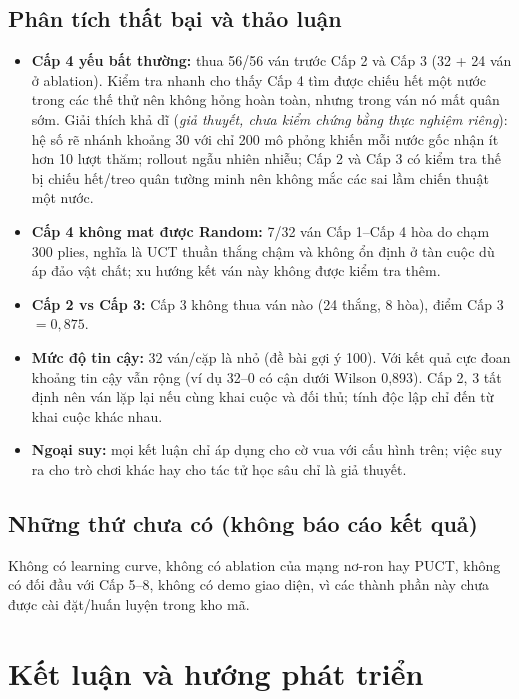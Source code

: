 \documentclass[13pt,a4paper]{extreport}
\begin{document}
\section{Phân tích thất bại và thảo luận}
\begin{itemize}
\item \textbf{Cấp 4 yếu bất thường:} thua 56/56 ván trước Cấp 2 và Cấp 3 (32 + 24 ván ở ablation). Kiểm tra nhanh cho thấy Cấp 4 tìm được chiếu hết một nước trong các thế thử nên không hỏng hoàn toàn, nhưng trong ván nó mất quân sớm. Giải thích khả dĩ (\emph{giả thuyết, chưa kiểm chứng bằng thực nghiệm riêng}): hệ số rẽ nhánh khoảng 30 với chỉ 200 mô phỏng khiến mỗi nước gốc nhận ít hơn 10 lượt thăm; rollout ngẫu nhiên nhiễu; Cấp 2 và Cấp 3 có kiểm tra thế bị chiếu hết/treo quân tường minh nên không mắc các sai lầm chiến thuật một nước.
\item \textbf{Cấp 4 không mat được Random:} 7/32 ván Cấp 1--Cấp 4 hòa do chạm 300 plies, nghĩa là UCT thuần thắng chậm và không ổn định ở tàn cuộc dù áp đảo vật chất; xu hướng kết ván này không được kiểm tra thêm.
\item \textbf{Cấp 2 vs Cấp 3:} Cấp 3 không thua ván nào (24 thắng, 8 hòa), điểm Cấp 3 $=0{,}875$.
\item \textbf{Mức độ tin cậy:} 32 ván/cặp là nhỏ (đề bài gợi ý 100). Với kết quả cực đoan khoảng tin cậy vẫn rộng (ví dụ 32--0 có cận dưới Wilson 0,893). Cấp 2, 3 tất định nên ván lặp lại nếu cùng khai cuộc và đối thủ; tính độc lập chỉ đến từ khai cuộc khác nhau.
\item \textbf{Ngoại suy:} mọi kết luận chỉ áp dụng cho cờ vua với cấu hình trên; việc suy ra cho trò chơi khác hay cho tác tử học sâu chỉ là giả thuyết.
\end{itemize}

\section{Những thứ chưa có (không báo cáo kết quả)}
Không có learning curve, không có ablation của mạng nơ-ron hay PUCT, không có đối đầu với Cấp 5--8, không có demo giao diện, vì các thành phần này chưa được cài đặt/huấn luyện trong kho mã.

\chapter{Kết luận và hướng phát triển}
\end{document}
